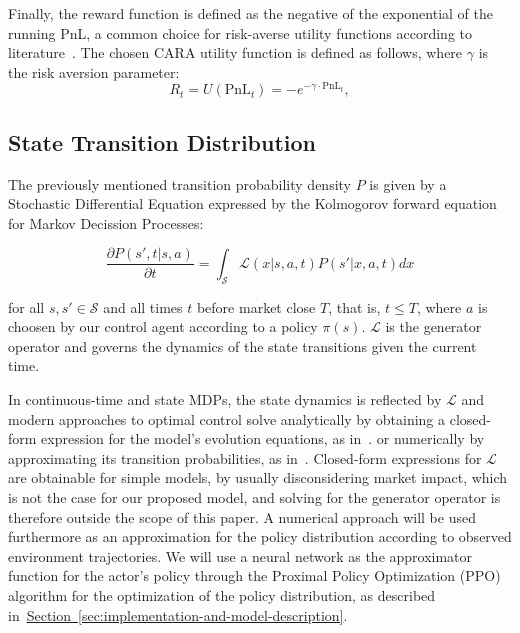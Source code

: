 Finally, the reward function is defined as the negative of the exponential of the running PnL, a common choice for risk-averse utility functions according to literature~\cite{Gueant2022, Selser2021a, FalcesMarin2022}.
The chosen CARA utility function is defined as follows, where \( \gamma \) is the risk aversion parameter:
\[
    R_t = U(\text{PnL}_t) = -e^{-\gamma \cdot \text{PnL}_t},
\]

\subsection{State Transition Distribution}
\label{subsec:state-transition-distribution}

The previously mentioned transition probability density $P$ is given by a Stochastic Differential Equation expressed by the Kolmogorov forward equation for Markov Decission Processes:

\begin{equation}
    \label{eq:equation2}
    \frac{\partial P(s', t | s, a)}{\partial t}  = \int_{\mathcal{S}} \mathcal{L}(x | s, a, t) P(s'| x, a, t) dx
\end{equation}

for all $s, s' \in \mathcal{S}$ and all times $t$ before market close $T$, that is, $t \le T$,
where $a$ is choosen by our control agent according to a policy $\pi (s)$.
$\mathcal{L}$ is the generator operator and governs the dynamics of the state transitions given the current time.

In continuous-time and state MDPs, the state dynamics is reflected by $\mathcal{L}$ and modern approaches to optimal control
solve analytically by obtaining a closed-form expression for the model's evolution equations, as in~\citet{Avellaneda2008, Gueant2017}.
or numerically by approximating its transition probabilities, as in~\citet{Gueant2022, Selser2021a, FalcesMarin2022}.
Closed-form expressions for $\mathcal{L}$ are obtainable for simple models, by usually disconsidering market impact,
which is not the case for our proposed model, and solving for the generator operator is therefore outside the scope of this paper.
A numerical approach will be used furthermore as an approximation for the policy distribution according to observed environment trajectories.
We will use a neural network as the approximator function for the actor's policy through the Proximal Policy Optimization (PPO) algorithm
for the optimization of the policy distribution, as described in~\hyperref[sec:implementation-and-models]{Section~\ref*{sec:implementation-and-model-description}}.
